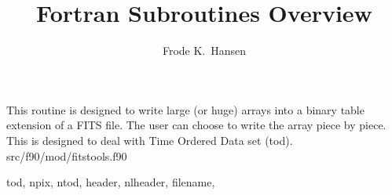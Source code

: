 
\sloppy


\title{\healpix Fortran Subroutines Overview}
 \section[write\_bintabh]{ }
\label{sub:write_bintabh}
\author{Frode K.~Hansen}

\begin{facility}
{This routine is designed to write large (or huge) arrays into a binary table
extension of a FITS file. The user can
choose to write the array piece by piece. This is designed to deal with Time
Ordered Data set (tod).}
{src/f90/mod/fitstools.f90}
\end{facility}

\begin{f90format}
{tod, npix, ntod, header, nlheader, filename, }
\end{f90format}
\aboutoptional

